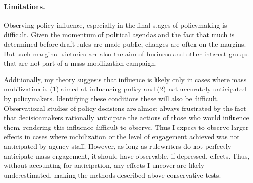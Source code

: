 \paragraph{Limitations.} 

Observing policy influence, especially in the final stages of policymaking is difficult. Given the momentum of political agendas and the fact that much is determined before draft rules are made public, changes are often on the margins. But such marginal victories are also the aim of business and other interest groups that are not part of a mass mobilization campaign. 

Additionally, my theory suggests that influence is likely only in cases where mass mobilization is (1) aimed at influencing policy and (2) not accurately anticipated by policymakers. Identifying these conditions these will also be difficult.
Observational studies of policy decisions are almost always frustrated by the fact that decisionmakers rationally anticipate the actions of those who would influence them, rendering this influence difficult to observe. Thus I expect to observe larger effects in cases where mobilization or the level of engagement achieved was not anticipated by agency staff. However, as long as rulewriters do not perfectly anticipate mass engagement, it should have observable, if depressed, effects. Thus, without accounting for anticipation, any effects I uncover are likely underestimated, making the methods described above conservative tests.










